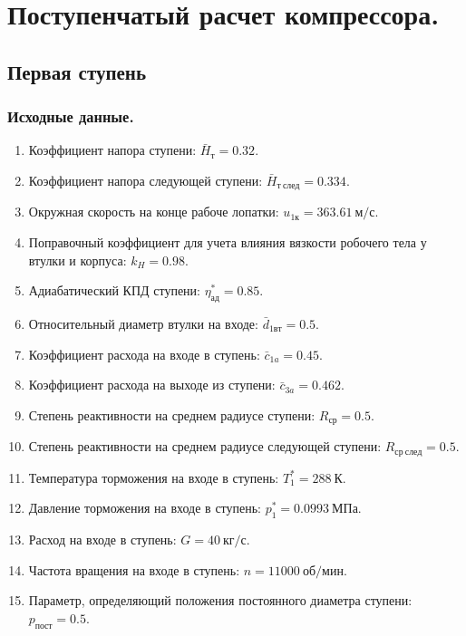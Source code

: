 \documentclass[a4paper,10pt]{article}
\begin{document}
    \section{Поступенчатый расчет компрессора.}

    

    \subsection{Первая ступень}
    \subsubsection{Исходные данные.}

    
    \begin{enumerate}

        \item Коэффициент напора ступени: $\bar{H}_{т} = 0.32$.
        \item Коэффициент напора следующей ступени: $ \bar{H}_{т\ след} = 0.334$.
        \item Окружная скорость на конце рабоче лопатки: $ u_{1к} = 363.61\ м/с $.
        \item Поправочный коэффициент для учета влияния вязкости робочего тела у втулки и корпуса: $ k_H = 0.98 $.
        \item Адиабатический КПД ступени: $ \eta_{ад}^* = 0.85 $.
        \item Относительный диаметр втулки на входе: $ \bar{d}_{1вт} = 0.5 $.
        \item Коэффициент расхода на входе в ступень: $ \bar{c}_{1a} = 0.45 $.
        \item Коэффициент расхода на выходе из ступени: $ \bar{c}_{3a} = 0.462 $.
        \item Степень реактивности на среднем радиусе ступени: $ R_{ср} = 0.5 $.
        \item Степень реактивности на среднем радиусе следующей ступени: $ R_{ср\ след} = 0.5 $.
        \item Температура торможения на входе в ступень: $ T_1^* = 288\ К $.
        \item Давление торможения на входе в ступень: $ p_1^* = 0.0993\ МПа $.
        \item Расход на входе в ступень: $ G = 40\ кг/с $.
        \item Частота вращения на входе в ступень: $ n = 11000\ об/мин $.
        \item Параметр, определяющий положения постоянного диаметра ступени: $ p_{пост} = 0.5 $.


    \end{enumerate}
    
\end{document}
